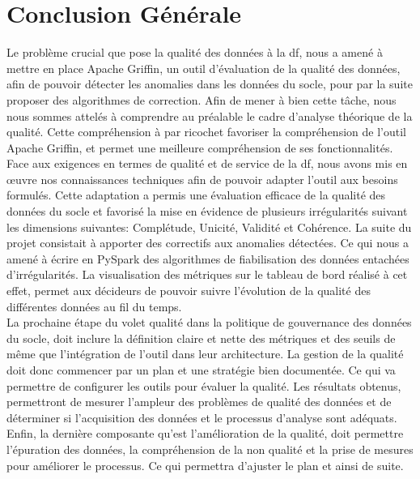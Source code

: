 \cleardoublepage
{}
{}

\vspace*{0.5cm}
\section*{\centering \Huge Conclusion G\'en\'erale}
\titlerule[2.0pt]
\vspace{1cm}
Le problème crucial que pose la qualité des données \`a la \acrlong{df}, nous a amené \`a mettre en place Apache Griffin, un outil d'\'evaluation de la qualit\'e des donn\'ees, afin de pouvoir d\'etecter les anomalies dans les donn\'ees du socle, pour par la suite proposer des algorithmes de correction. Afin de mener \`a bien cette t\^ache, nous nous sommes attel\'es \`a comprendre au pr\'ealable le cadre d'analyse th\'eorique de la qualit\'e. Cette compr\'ehension \`a par ricochet favoriser la compr\'ehension de l'outil Apache Griffin, et permet une meilleure compr\'ehension de ses fonctionnalit\'es. \\

Face aux exigences en termes de qualit\'e et de service de la \acrshort{df}, nous avons mis en œuvre nos connaissances techniques afin de pouvoir adapter l'outil aux besoins formul\'es. Cette adaptation a permis une \'evaluation efficace de la qualit\'e des donn\'ees du socle et favoris\'e la mise en \'evidence de plusieurs irr\'egularit\'es suivant les dimensions suivantes: Compl\'etude, Unicit\'e, Validit\'e et Coh\'erence. La suite du projet consistait \`a apporter des correctifs aux anomalies d\'etect\'ees. Ce qui nous a amen\'e \`a \'ecrire en PySpark des algorithmes de fiabilisation des donn\'ees entachées d'irrégularités. La visualisation des m\'etriques sur le tableau de bord r\'ealis\'e \`a cet effet, permet aux d\'ecideurs de pouvoir suivre l'\'evolution de la qualit\'e des diff\'erentes donn\'ees au fil du temps.\\

La prochaine \'etape du volet qualit\'e dans la politique de gouvernance des donn\'ees du socle, doit inclure la d\'efinition claire et nette des m\'etriques et des seuils de m\^eme que l'int\'egration de l'outil dans leur architecture. La gestion de la qualit\'e doit donc commencer par un plan et une strat\'egie bien document\'ee. Ce qui va permettre de configurer les outils pour \'evaluer la qualit\'e. Les r\'esultats obtenus, permettront de mesurer l'ampleur des problèmes de qualité des données et de déterminer si l'acquisition des données et le processus d'analyse sont adéquats. Enfin, la dernière composante qu'est l'amélioration de la qualité, doit permettre l'\'epuration des donn\'ees, la compr\'ehension de la non qualit\'e et la prise de mesures pour améliorer le processus. Ce qui permettra d'ajuster le plan et ainsi de suite.